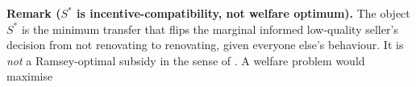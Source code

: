\medskip\noindent\textbf{Remark ($S^*$ is incentive-compatibility, not welfare optimum).}\label{rem:welfare}
The object $S^*$ is the minimum transfer that flips the marginal informed low-quality seller's decision from not renovating to renovating, given everyone else's behaviour. It is \emph{not} a Ramsey-optimal subsidy in the sense of \citet{ramsey_taxation_1927}. A welfare problem would maximise
